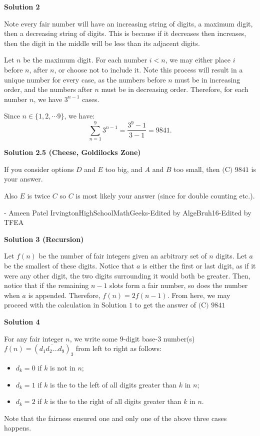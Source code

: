 \begin{enumerate}
 



\textbf{Solution 2}

Note every fair number will have an increasing string of digits, a maximum digit, then a decreasing string of digits. This is because if it decreases then increases, then the digit in the middle will be less than its adjacent digits.

 Let $n$ be the maximum digit. For each number $i<n$, we may either place $i$ before $n$, after $n$, or choose not to include it. Note this process will result in a unique number for every case, as the numbers before $n$ must be in increasing order, and the numbers after $n$ must be in decreasing order. Therefore, for each number $n$, we have $3^{n-1}$ cases.

 Since $n \in \{1,2,\cdots9\}$, we have:
 \[\sum_{n=1}^9 3^{n-1}=\frac{3^9-1}{3-1}=\boxed{9841}.\]




\textbf{Solution 2.5 (Cheese, Goldilocks Zone)}

If you consider options $D$ and $E$ too big, and $A$ and $B$ too small, then $\boxed {\text {(C) } 9841}$ is your answer.

 Also $E$ is twice $C$ so $C$ is most likely your answer (since for double counting etc.). 

 - Ameen Patel IrvingtonHighSchoolMathGeeks-Edited by AlgeBruh16-Edited by TFEA

 



\textbf{Solution 3 (Recursion)}

Let $f(n)$ be the number of fair integers given an arbitrary set of $n$ digits. Let $a$ be the smallest of these digits. Notice that $a$ is either the first or last digit, as if it were any other digit, the two digits surrounding it would both be greater. Then, notice that if the remaining $n-1$ slots form a fair number, so does the number when $a$ is appended. Therefore, $f(n) = 2f(n-1)$. From here, we may proceed with the calculation in Solution $1$ to get the answer of $\boxed {\text {(C) } 9841}$




\textbf{Solution 4}

For any fair integer $n$, we write some $9$-digit base-$3$ number(s) $f(n)=\left(\overline{d_1 d_2 \ldots d_9}\right)_3$ from left to right as follows:

 
            \begin{itemize}
        \item $d_k=0$ if $k$ is not in $n$;
        \item $d_k=1$ if $k$ is the to the left of all digits greater than $k$ in $n$;
        \item $d_k=2$ if $k$ is the to the right of all digits greater than $k$ in $n$.
            \end{itemize}
            Note that the fairness ensured one and only one of the above three cases happens. 


\end{enumerate}
